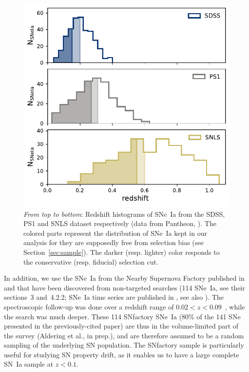 \documentclass[]{aa}
\newcommand{\nn}[1]{\textcolor[rgb]{0.4, 0.8, 0}{#1}}
\begin{document}
\begin{figure}
    \centering
    \includegraphics[width=0.95\linewidth]{Article_figures/hist_surveys_cuts_55-cividis.pdf}
    \caption{\textit{From top to bottom}: Redshift histograms of SNe~Ia from
        the SDSS, PS1 and SNLS dataset respectively (data from Pantheon,
        \citealt{scolnic2018a}). The colored parts represent the distribution
        of SNe~Ia kept in our analysis for they are supposedly free from
        selection bias (see Section~\ref{sec:sample}). The darker (resp. lighter)
        color responds to the conservative (resp. fiducial) selection cut.}
    \label{fig:cuts}
\end{figure}

In addition, we use the SNe~Ia from the Nearby Supernova Factory
\citep[SNfactory,][]{aldering2002} published in \cite{rigault2018} and that have
been discovered from non-targeted searches (114 SNe~Ia, see their sections~3
and~4.2.2; SNe~Ia time series are published in \citealt{saunders2020}, see also
\citealt{aldering2020}). The spectroscopic follow-up was done over a redshift
range of $0.02 < z < 0.09$~\citep[as in][]{rigault2018}, while the search was
much deeper. These 114 SNfactory SNe~Ia \nn{(80\% of the 141 SNe presented in
the previously-cited paper)} are thus in the volume-limited part of the
survey (Aldering et al., in prep.), and are therefore assumed to be a random
sampling of the underlying SN population. The SNfactory sample is
particularly useful for studying SN property drift, as it enables us to have
a large complete SN~Ia sample at $z<0.1$. 
\end{document}
